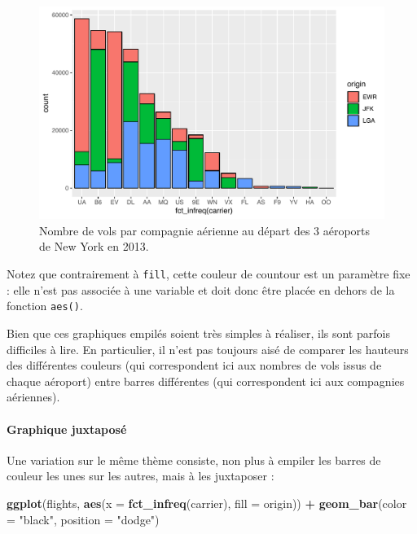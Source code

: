 \documentclass[a4paperpaper,]{article}
\newenvironment{Shaded}{\begin{snugshade}}{\end{snugshade}}
\newcommand{\KeywordTok}[1]{\textcolor[rgb]{0.13,0.29,0.53}{\textbf{#1}}}
\newcommand{\DataTypeTok}[1]{\textcolor[rgb]{0.13,0.29,0.53}{#1}}
\newcommand{\StringTok}[1]{\textcolor[rgb]{0.31,0.60,0.02}{#1}}
\newcommand{\OperatorTok}[1]{\textcolor[rgb]{0.81,0.36,0.00}{\textbf{#1}}}
\newcommand{\NormalTok}[1]{#1}
\let\oldparagraph\paragraph
\renewcommand{\paragraph}[1]{\oldparagraph{#1}\mbox{}}
\theoremstyle{definition}
\theoremstyle{definition}
\theoremstyle{definition}
\theoremstyle{remark}
\begin{document}
\begin{figure}[htpb]

{\centering \includegraphics[width=0.9\linewidth]{figure/stacked2-1} 

}

\caption{Nombre de vols par compagnie aérienne au départ des 3 aéroports de New York en 2013.}\label{fig:stacked2}
\end{figure}

Notez que contrairement à \texttt{fill}, cette couleur de countour est
un paramètre fixe : elle n'est pas associée à une variable et doit donc
être placée en dehors de la fonction \texttt{aes()}.

Bien que ces graphiques empilés soient très simples à réaliser, ils sont
parfois difficiles à lire. En particulier, il n'est pas toujours aisé de
comparer les hauteurs des différentes couleurs (qui correspondent ici
aux nombres de vols issus de chaque aéroport) entre barres différentes
(qui correspondent ici aux compagnies aériennes).

\paragraph{Graphique juxtaposé}\label{graphique-juxtapose}

Une variation sur le même thème consiste, non plus à empiler les barres
de couleur les unes sur les autres, mais à les juxtaposer :

\begin{Shaded}
\begin{Highlighting}[]
\KeywordTok{ggplot}\NormalTok{(flights, }\KeywordTok{aes}\NormalTok{(}\DataTypeTok{x =} \KeywordTok{fct_infreq}\NormalTok{(carrier), }\DataTypeTok{fill =}\NormalTok{ origin)) }\OperatorTok{+}
\StringTok{  }\KeywordTok{geom_bar}\NormalTok{(}\DataTypeTok{color =} \StringTok{"black"}\NormalTok{, }\DataTypeTok{position =} \StringTok{"dodge"}\NormalTok{)}
\end{Highlighting}
\end{Shaded}
\end{document}
